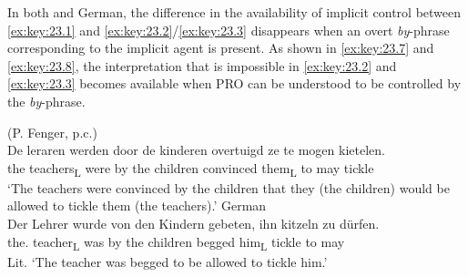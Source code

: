 \documentclass[output=paper]{langsci/langscibook}
\begin{document}
\ea%
    \label{ex:key:23.6}
\z
%
In both  and German, the difference in the availability of implicit
control between \eqref{ex:key:23.1} and \eqref{ex:key:23.2}/\eqref{ex:key:23.3}
disappears when an overt \emph{by}-phrase corresponding to the implicit agent
is present. As shown in \eqref{ex:key:23.7} and \eqref{ex:key:23.8}, the
interpretation that is impossible in \eqref{ex:key:23.2} and
\eqref{ex:key:23.3} becomes available when PRO can be understood to be
controlled by the \emph{by}-phrase.

\ea\label{ex:key:23.7}
	\ea\label{ex:key:23.7a}  (P. Fenger, p.c.)\\
		\gll De leraren  werden  door de kinderen  overtuigd  ze  te mogen  kietelen.\\
			the teachers\textsubscript{L}  were  by the children  convinced  them\textsubscript{L}  to may  tickle\\
		\glt ‘The teachers were convinced by the children that they (the
        children) would be allowed to tickle them (the teachers).’\newpage
	\ex\label{ex:key:23.7b} German\\
		\gll Der Lehrer  wurde  von den Kindern  gebeten,  ihn  kitzeln  zu dürfen.\\
			the.\Nom{} teacher\textsubscript{L}  was  by the children  begged  him\textsubscript{L}  tickle  to may\\
		\glt Lit. ‘The teacher was begged to be allowed to tickle him.’
	\z
\z
\end{document}
